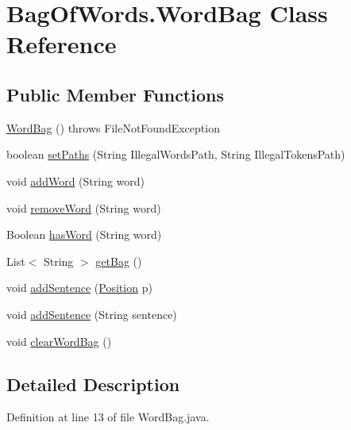 \hypertarget{class_bag_of_words_1_1_word_bag}{}\section{Bag\+Of\+Words.\+Word\+Bag Class Reference}
\label{class_bag_of_words_1_1_word_bag}
\subsection*{Public Member Functions}
\begin{DoxyCompactItemize}
\item 
\hyperlink{class_bag_of_words_1_1_word_bag_a7464ca7b08fa51ee8f4967b017896a7e}{Word\+Bag} ()  throws File\+Not\+Found\+Exception
\item 
boolean \hyperlink{class_bag_of_words_1_1_word_bag_ad96f1fd5eec992c63057662c5a89e0ef}{set\+Paths} (String Illegal\+Words\+Path, String Illegal\+Tokens\+Path)
\item 
void \hyperlink{class_bag_of_words_1_1_word_bag_a3aad2cb0de46bbc029e3c8d59eb9cda3}{add\+Word} (String word)
\item 
void \hyperlink{class_bag_of_words_1_1_word_bag_a0c4bd3144d99a6b98c63f97704cfafaa}{remove\+Word} (String word)
\item 
Boolean \hyperlink{class_bag_of_words_1_1_word_bag_a1b34ea94ef1ecf6428d321b2fd5e0359}{has\+Word} (String word)
\item 
List$<$ String $>$ \hyperlink{class_bag_of_words_1_1_word_bag_ab2b3aa2a9ea3821cf365878f954a5abd}{get\+Bag} ()
\item 
void \hyperlink{class_bag_of_words_1_1_word_bag_a540190bee1fcf153d1a9f0bcb9fe2cd0}{add\+Sentence} (\hyperlink{class_reduced_invoice_1_1_position}{Position} p)
\item 
void \hyperlink{class_bag_of_words_1_1_word_bag_a9c60c49329b0ef68e47c7af85eccae00}{add\+Sentence} (String sentence)
\item 
void \hyperlink{class_bag_of_words_1_1_word_bag_af9d453225cdd2a3c42488f4862e59cb1}{clear\+Word\+Bag} ()
\end{DoxyCompactItemize}


\subsection{Detailed Description}


Definition at line 13 of file Word\+Bag.\+java.



